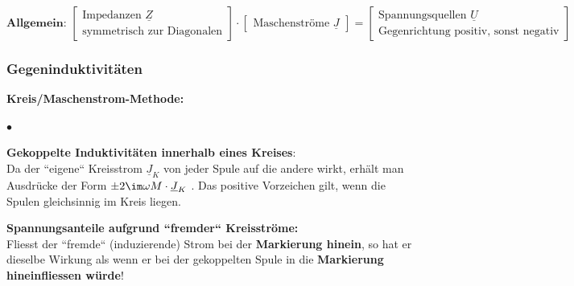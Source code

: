 $$\textbf{Allgemein: }\left[ \begin{array}{cc}
       \text{Impedanzen $\underline{Z}$} \\
       \text{symmetrisch zur Diagonalen}
       \end{array}\right] \cdot \left[ \begin{array}{cc}
     \text{Maschenströme $\underline{J}$}
     \end{array}\right] =
\left[ \begin{array}{cc}
     \text{Spannungsquellen $\underline{U}$} \\
    \text{Gegenrichtung positiv, sonst negativ}
     \end{array}\right]$$

\subsubsection{Gegeninduktivitäten}
	\textbf{Kreis/Maschenstrom-Methode:}
	\begin{list}{$\bullet$}{\setlength{\itemsep}{0cm} \setlength{\parsep}{0cm} \setlength{\topsep}{0cm}} 
	
		\item {\textbf{Gekoppelte Induktivitäten innerhalb eines Kreises}:\\
		Da der ``eigene`` Kreisstrom $\underline{J}_K$ von jeder Spule auf die andere wirkt, erhält man Ausdrücke der Form $\pm 2 \im\omega M \cdot \underline{J}_K$ . Das positive Vorzeichen gilt, wenn die Spulen gleichsinnig im Kreis liegen.\\}
		\item {\textbf{Spannungsanteile aufgrund ``fremder`` Kreisströme:}\\
		Fliesst der ``fremde`` (induzierende) Strom bei der \textbf{Markierung hinein}, so hat er dieselbe
		Wirkung als wenn er bei der gekoppelten Spule in die \textbf{Markierung
		hineinfliessen würde}!}\\
		
	\end{list}

